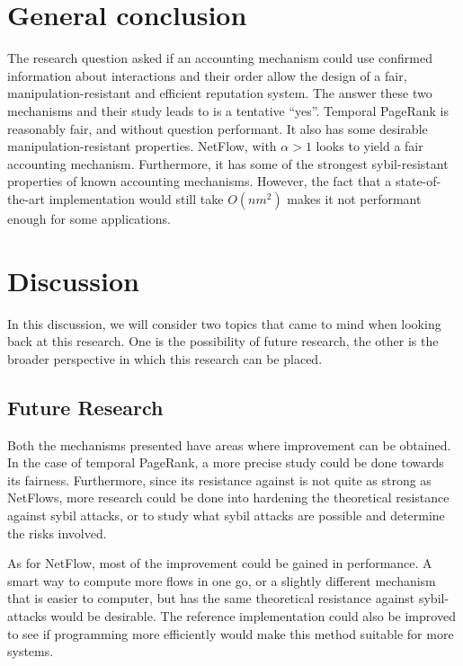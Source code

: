 \documentclass[a4paper,11pt]{book}
\theoremstyle{definition}
\begin{document}
\section{General conclusion}

The research question asked if an accounting mechanism could use confirmed information about
interactions and their order allow the design of a fair, manipulation-resistant and efficient
reputation system. The answer these two mechanisms and their study leads to is a tentative
``yes''. Temporal PageRank is reasonably fair, and without question performant. It also
has some desirable manipulation-resistant properties. NetFlow, with $\alpha>1$ looks to
yield a fair accounting mechanism. Furthermore, it has some of the strongest sybil-resistant
properties of known accounting mechanisms. However, the fact that a state-of-the-art implementation
would still take $O(nm^2)$ makes it not performant enough for some applications.


\section{Discussion}

In this discussion, we will consider two topics that came to mind when looking back at this
research. One is the possibility of future research, the other is the broader perspective
in which this research can be placed. 

\subsection{Future Research}

Both the mechanisms presented have areas where improvement can be obtained. In the case of
temporal PageRank, a more precise study could be done towards its fairness. Furthermore,
since its resistance against is not quite as strong as NetFlows, more research could be done
into hardening the theoretical resistance against sybil attacks, or to study what sybil
attacks are possible and determine the risks involved.

As for NetFlow, most of the improvement could be gained in performance. A smart way
to compute more flows in one go, or a slightly different mechanism that is
easier to computer, but has the same theoretical resistance against sybil-attacks 
would be desirable. The reference implementation could also be improved to see if
programming more efficiently would make this method suitable for more systems.
\end{document}
